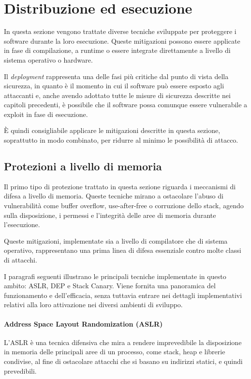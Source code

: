 \section{Distribuzione ed esecuzione}
\label{sec:deployment}

In questa sezione vengono trattate diverse tecniche sviluppate per proteggere i software
durante la loro esecuzione. Queste mitigazioni possono essere applicate in fase
di compilazione, a runtime o essere integrate direttamente a livello di sistema operativo
o hardware.

Il \textit{deployment} rappresenta una delle fasi più critiche dal punto di
vista della sicurezza, in quanto è il momento in cui il software può essere esposto
agli attaccanti e, anche avendo adottato tutte le misure di sicurezza descritte
nei capitoli precedenti, è possibile che il software possa comunque essere vulnerabile
a exploit in fase di esecuzione.

È quindi consigliabile applicare le mitigazioni descritte in questa sezione,
soprattutto in modo combinato, per ridurre al minimo le possibilità di attacco.

\subsection{Protezioni a livello di memoria}
\label{sec:memory-protection}

Il primo tipo di protezione trattato in questa sezione riguarda i meccanismi di
difesa a livello di memoria. Queste tecniche mirano a ostacolare l'abuso di vulnerabilità
come buffer overflow, use-after-free o corruzione dello stack, agendo sulla disposizione,
i permessi e l'integrità delle aree di memoria durante l'esecuzione.

Queste mitigazioni, implementate sia a livello di compilatore che di sistema operativo,
rappresentano una prima linea di difesa essenziale contro molte classi di
attacchi.

I paragrafi seguenti illustrano le principali tecniche implementate in questo
ambito: ASLR, DEP e Stack Canary. Viene fornita una panoramica del funzionamento
e dell'efficacia, senza tuttavia entrare nei dettagli implementativi relativi
alla loro attivazione nei diversi ambienti di sviluppo.

\paragraph{Address Space Layout Randomization (ASLR)}
L'ASLR è una tecnica difensiva che mira a rendere imprevedibile la disposizione in
memoria delle principali aree di un processo, come stack, heap e librerie condivise,
al fine di ostacolare attacchi che si basano su indirizzi statici, e quindi prevedibili.

